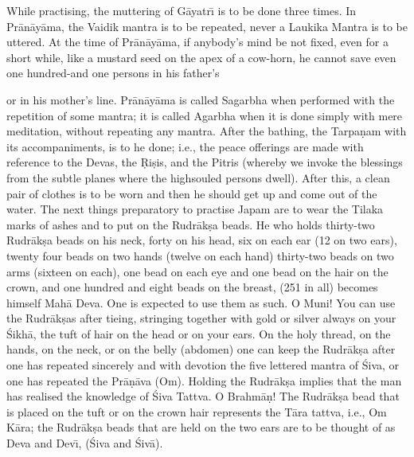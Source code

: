 While practising, the muttering of G\=ayatr\={\i} is to be done three times. In Pr\=an\=ay\=ama, the Vaidik mantra is to be repeated, never a Laukika Mantra is to be uttered. At the time of Pr\=an\=ay\=ama, if anybody's mind be not fixed, even for a short while, like a mustard seed on the apex of a cow-horn, he cannot save even one hundred-and one persons in his father's

or in his mother's line. Pr\=an\=ay\=ama is called Sagarbha when performed with the repetition of some mantra; it is called Agarbha when it is done simply with mere meditation, without repeating any mantra. After the bathing, the Tarpa\d{n}am with its accompaniments, is to he done; i.e., the peace offerings are made with reference to the Devas, the \d{R}i\d{s}is, and the Pitris (whereby we invoke the blessings from the subtle planes where the highsouled persons dwell). After this, a clean pair of clothes is to be worn and then he should get up and come out of the water. The next things preparatory to practise Japam are to wear the Tilaka marks of ashes and to put on the Rudr\=ak\d{s}a beads. He who holds thirty-two Rudr\=ak\d{s}a beads on his neck, forty on his head, six on each ear (12 on two ears), twenty four beads on two hands (twelve on each hand) thirty-two beads on two arms (sixteen on each), one bead on each eye and one bead on the hair on the crown, and one hundred and eight beads on the breast, (251 in all) becomes himself Mah\=a Deva. One is expected to use them as such. O Muni! You can use the Rudr\=ak\d{s}as after tieing, stringing together with gold or silver always on your \'Sikh\=a, the tuft of hair on the head or on your ears. On the holy thread, on the hands, on the neck, or on the belly (abdomen) one can keep the Rudr\=ak\d{s}a after one has repeated sincerely and with devotion the five lettered mantra of \'Siva, or one has repeated the Pr\=a\d{n}\=ava (Om). Holding the Rudr\=ak\d{s}a implies that the man has realised the knowledge of \'Siva Tattva. O Brahm\=a\d{n}! The Rudr\=ak\d{s}a bead that is placed on the tuft or on the crown hair represents the T\=ara tattva, i.e., Om K\=ara; the Rudr\=ak\d{s}a beads that are held on the two ears are to be thought of as Deva and Dev\={\i}, (\'Siva and \'Siv\=a).

